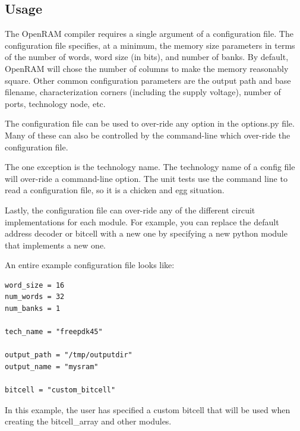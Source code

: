 


\subsection{Usage}

The OpenRAM compiler requires a single argument of a configuration
file. The configuration file specifies, at a minimum, the memory size
parameters in terms of the number of words, word size (in bits), and
number of banks. By default, OpenRAM will chose the number of columns
to make the memory reasonably square. Other common configuration
parameters are the output path and base filename, characterization
corners (including the supply voltage), number of ports, technology
node, etc.

The configuration file can be used to over-ride any option in the
options.py file.  Many of these can also be controlled by the command-line
which over-ride the configuration file.

The one exception is the technology name. The technology name of a
config file will over-ride a command-line option. The unit tests use
the command line to read a configuration file, so it is a chicken and
egg situation.

Lastly, the configuration file can over-ride any of the different
circuit implementations for each module. For example, you can replace
the default address decoder or bitcell with a new one by specifying a
new python module that implements a new one.

An entire example configuration file looks like:
\begin{verbatim}
word_size = 16
num_words = 32
num_banks = 1

tech_name = "freepdk45"

output_path = "/tmp/outputdir"
output_name = "mysram"

bitcell = "custom_bitcell"
\end{verbatim}
In this example, the user has specified a custom bitcell that will be
used when creating the bitcell\_array and other modules.

